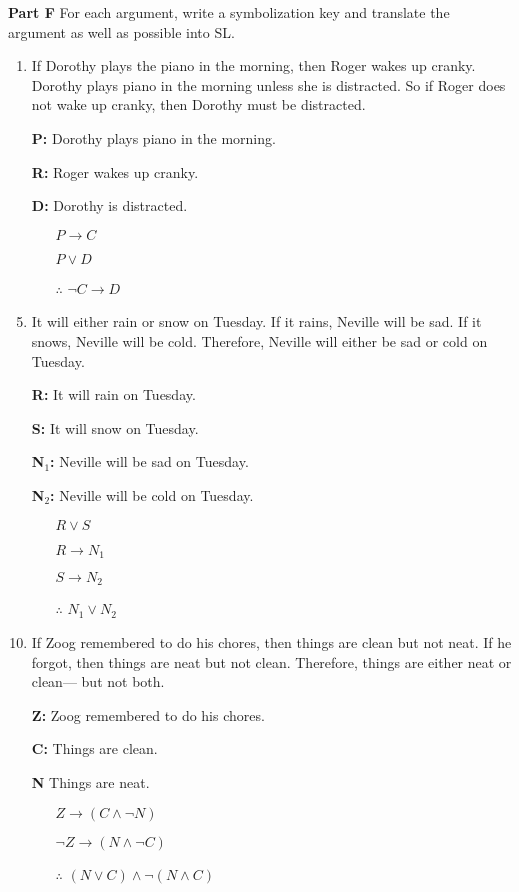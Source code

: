 \documentclass[12pt, letterpaper, twoside]{article}
\begin{document}
\noindent \textbf{Part F} For each argument, write a symbolization key and translate the argument as well as possible into SL.
\begin{enumerate}
	\item If Dorothy plays the piano in the morning, then Roger wakes up cranky. Dorothy plays piano in the morning unless she is distracted. So if Roger does not wake up cranky, then Dorothy must be distracted.

	\item[\textbf{P:}] Dorothy plays piano in the morning.
	\item[\textbf{R:}] Roger wakes up cranky.
	\item[\textbf{D:}] Dorothy is distracted.

    \begin{enumerate}
        \item[] $P \rightarrow C$
        \item[] $P \vee D$
        \item[$\therefore$] $\neg C \rightarrow D$
    \end{enumerate}

	\item It will either rain or snow on Tuesday. If it rains, Neville will be sad. If it snows, Neville will be cold. Therefore, Neville will either be sad or cold on Tuesday.

	\item[\textbf{R:}] It will rain on Tuesday.
	\item[\textbf{S:}] It will snow on Tuesday.
	\item[\textbf{N$_1$:}] Neville will be sad on Tuesday.
	\item[\textbf{N$_2$:}] Neville will be cold on Tuesday.
	
    \begin{enumerate}
        \item[] $R \vee S$
        \item[] $R \rightarrow N_1$
        \item[] $S \rightarrow N_2$
        \item[$\therefore$] $N_1 \vee N_2$
    \end{enumerate}

	\item If Zoog remembered to do his chores, then things are clean but not neat. If he forgot, then things are neat but not clean. Therefore, things are either neat or clean--- but not both.

	\item[\textbf{Z:}] Zoog remembered to do his chores.
	\item[\textbf{C:}] Things are clean.
	\item[\textbf{N}] Things are neat.
	
    \begin{enumerate}
        \item[] $Z \rightarrow (C \wedge \neg N)$
        \item[] $\neg Z \rightarrow (N \wedge \neg C)$
        \item[$\therefore$] $(N \vee C) \wedge \neg (N \wedge C)$
    \end{enumerate}
\end{enumerate}
\end{document}
